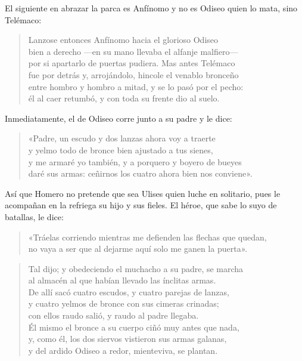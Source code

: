 El siguiente en abrazar la parca es Anfínomo y no es Odiseo quien lo mata, sino Telémaco:

\begin{verse}
Lanzose entonces Anfínomo hacia el glorioso Odiseo\\
bien a derecho ---en su mano llevaba el alfanje malfiero---\\
por si apartarlo de puertas pudiera. Mas antes Telémaco\\
fue por detrás y, arrojándolo, hincole el venablo bronceño\\
entre hombro y hombro a mitad, y se lo pasó por el pecho:\\
él al caer retumbó, y con toda su frente dio al suelo.
\end{verse}

Inmediatamente, el de Odiseo corre junto a su padre y le dice:

\begin{verse}
«Padre, un escudo y dos lanzas ahora voy a traerte\\
y yelmo todo de bronce bien ajustado a tus sienes,\\
y me armaré yo también, y a porquero y boyero de bueyes\\
daré sus armas: ceñirnos los cuatro ahora bien nos conviene».
\end{verse}

Así que Homero no pretende que sea Ulises quien luche en solitario, pues le acompañan en la refriega su hijo y sus fieles. El héroe, que sabe lo suyo de batallas, le dice:

\begin{verse}
«Tráelas corriendo mientras me defienden las flechas que quedan,\\
no vaya a ser que al dejarme aquí solo me ganen la puerta».
\end{verse}

\begin{verse}
Tal dijo; y obedeciendo el muchacho a su padre, se marcha\\
al almacén al que habían llevado las ínclitas armas.\\
De allí sacó cuatro escudos, y cuatro parejas de lanzas,\\
y cuatro yelmos de bronce con sus cimeras crinadas;\\
con ellos raudo salió, y raudo al padre llegaba.\\
Él mismo el bronce a su cuerpo ciñó muy antes que nada,\\
y, como él, los dos siervos vistieron sus armas galanas,\\
y del ardido Odiseo a redor, mienteviva, se plantan.
\end{verse}

